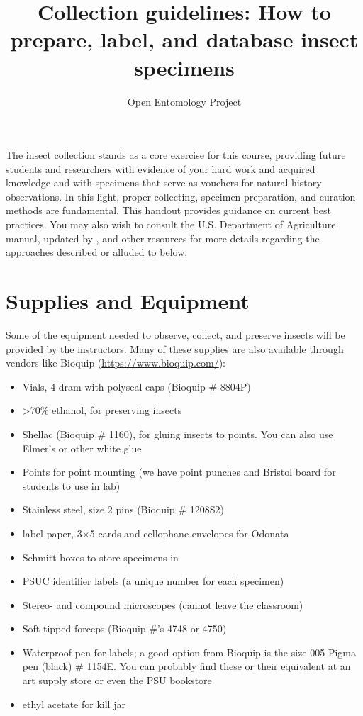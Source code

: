 \documentclass[letterpaper, 11pt]{article}
\title{Collection guidelines: How to prepare, label, and database insect specimens}
\author{Open Entomology Project}
\begin{document}
\cleanlookdateon %
\maketitle
\thispagestyle{fancy}

\noindent{}The insect collection stands as a core exercise for this course, providing future students and researchers with evidence of your hard work and acquired knowledge and with specimens that serve as vouchers for natural history observations. In this light, proper collecting, specimen preparation, and curation methods are fundamental. This handout provides guidance on current best practices. You may also wish to consult the U.S. Department of Agriculture manual, updated by \cite{USDAmanual}, and other resources for more details regarding the approaches described or alluded to below. 

\section*{Supplies and Equipment}
Some of the equipment needed to observe, collect, and preserve insects will be provided by the instructors. Many of these supplies are also available through vendors like Bioquip (\url{https://www.bioquip.com/}):

\begin{itemize}
\item Vials, 4 dram with polyseal caps (Bioquip \# 8804P)
\item \textgreater70\% ethanol, for preserving insects
\item Shellac (Bioquip \# 1160), for gluing insects to points. You can also use Elmer's or other white glue
\item Points for point mounting (we have point punches and Bristol board for students to use in lab)
\item Stainless steel, size 2 pins (Bioquip \# 1208S2)
\item label paper, 3$\times$5 cards and cellophane envelopes for Odonata
\item Schmitt boxes to store specimens in
\item PSUC identifier labels (a unique number for each specimen)
\item Stereo- and compound microscopes (cannot leave the classroom)
\item Soft-tipped forceps (Bioquip \#'s 4748 or 4750)
\item Waterproof pen for labels; a good option from Bioquip is the size 005 Pigma pen (black) \# 1154E. You can probably find these or their equivalent at an art supply store or even the PSU bookstore
\item ethyl acetate for kill jar
\end{itemize}
\end{document}
